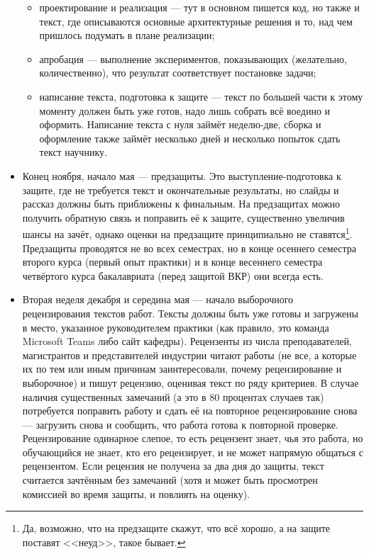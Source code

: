 \documentclass{article}
\begin{document}
\begin{itemize}
\begin{itemize}
        \item проектирование и реализация --- тут в основном пишется код, но также и текст, где описываются основные архитектурные решения и то, над чем пришлось подумать в плане реализации;
        \item апробация --- выполнение экспериментов, показывающих (желательно, количественно), что результат соответствует постановке задачи;
        \item написание текста, подготовка к защите --- текст по большей части к этому моменту должен быть уже готов, надо лишь собрать всё воедино и оформить. Написание текста с нуля займёт неделю-две, сборка и оформление также займёт несколько дней и несколько попыток сдать текст научнику.
    \end{itemize}
    \item Конец ноября, начало мая --- предзащиты. Это выступление-подготовка к защите, где не требуется текст и окончательные результаты, но слайды и рассказ должны быть приближены к финальным. На предзащитах можно получить обратную связь и поправить её к защите, существенно увеличив шансы на зачёт, однако оценки на предзащите принципиально не ставятся\footnote{Да, возможно, что на предзащите скажут, что всё хорошо, а на защите поставят <<неуд>>, такое бывает.}. Предзащиты проводятся не во всех семестрах, но в конце осеннего семестра второго курса (первый опыт практики) и в конце весеннего семестра четвёртого курса бакалавриата (перед защитой ВКР) они всегда есть.
    \item Вторая неделя декабря и середина мая --- начало выборочного рецензирования текстов работ. Тексты должны быть уже готовы и загружены в место, указанное руководителем практики (как правило, это команда Microsoft Teams либо сайт кафедры). Рецензенты из числа преподавателей, магистрантов и представителей индустрии читают работы (не все, а которые их по тем или иным причинам заинтересовали, почему рецензирование и выборочное) и пишут рецензию, оценивая текст по ряду критериев. В случае наличия существенных замечаний (а это в 80 процентах случаев так) потребуется поправить работу и сдать её на повторное рецензирование снова --- загрузить снова и сообщить, что работа готова к повторной проверке. Рецензирование одинарное слепое, то есть рецензент знает, чья это работа, но обучающийся не знает, кто его рецензирует, и не может напрямую общаться с рецензентом. Если рецензия не получена за два дня до защиты, текст считается зачтённым без замечаний (хотя и может быть просмотрен комиссией во время защиты, и повлиять на оценку).

\end{itemize}
\end{document}
